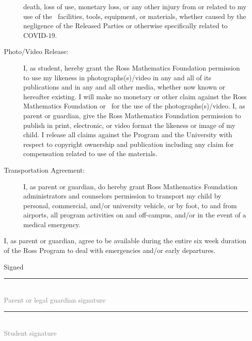 \documentclass{ross}
\begin{document}
\begin{description}
death, loss of use, monetary loss, or any other injury from or related to my use of the \campus\ facilities,
tools, equipment, or materials, whether caused by the negligence of the Released Parties or otherwise specifically
related to COVID-19.
\item[Photo/Video Release:] I, as student, hereby grant the Ross
  Mathematics Foundation permission to use my likeness in
  photographs(s)/video in any and all of its publications and in any
  and all other media, whether now known or hereafter existing. I will
  make no monetary or other claim against the Ross Mathematics Foundation or
  \campus\ for the use of the photographs(s)/video. I, as parent or
  guardian, give the Ross Mathematics Foundation permission to publish in
  print, electronic, or video format the likeness or image of my
  child. I release all claims against the Program and the University
  with respect to copyright ownership and publication including any
  claim for compensation related to use of the materials.
\item[Transportation Agreement:] I, as parent or guardian, do hereby
  grant Ross Mathematics Foundation administrators and counselors
  permission to transport my child by personal, commercial, and/or
  university vehicle, or by foot, to and from airports, all program
  activities on and off-campus, and/or in the event of a medical
  emergency.
\end{description}
I, as parent or guardian, agree to be available during the entire six
week duration of the Ross Program to deal with emergencies and/or early
departures.

\vspace{0.5in}
\hfill Signed \rule{3in}{0.1mm}\\[-1.5mm]
\hspace*{3.7in} {\footnotesize \textcolor{gray}{Parent or legal guardian signature} }


\vspace{0.5in}

\hfill  \rule{3in}{0.1mm}\\[-1.5mm]
\hspace*{3.7in} {\footnotesize \textcolor{gray}{Student signature} }


\end{document}
